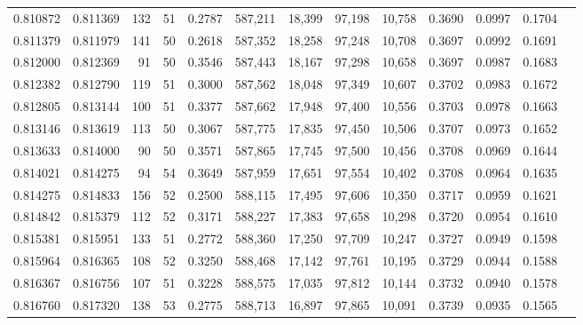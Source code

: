 \begin{tabular}{rrrrrrrrrrrrr}
0.810872 & 0.811369 &   132 &  51 &                                     0.2787 & 587,211 &  18,399 &  97,198 &  10,758 & 0.3690 & 0.0997 & 0.1704 \\
0.811379 & 0.811979 &   141 &  50 &                                     0.2618 & 587,352 &  18,258 &  97,248 &  10,708 & 0.3697 & 0.0992 & 0.1691 \\
0.812000 & 0.812369 &    91 &  50 &                                     0.3546 & 587,443 &  18,167 &  97,298 &  10,658 & 0.3697 & 0.0987 & 0.1683 \\
0.812382 & 0.812790 &   119 &  51 &                                     0.3000 & 587,562 &  18,048 &  97,349 &  10,607 & 0.3702 & 0.0983 & 0.1672 \\
0.812805 & 0.813144 &   100 &  51 &                                     0.3377 & 587,662 &  17,948 &  97,400 &  10,556 & 0.3703 & 0.0978 & 0.1663 \\
0.813146 & 0.813619 &   113 &  50 &                                     0.3067 & 587,775 &  17,835 &  97,450 &  10,506 & 0.3707 & 0.0973 & 0.1652 \\
0.813633 & 0.814000 &    90 &  50 &                                     0.3571 & 587,865 &  17,745 &  97,500 &  10,456 & 0.3708 & 0.0969 & 0.1644 \\
0.814021 & 0.814275 &    94 &  54 &                                     0.3649 & 587,959 &  17,651 &  97,554 &  10,402 & 0.3708 & 0.0964 & 0.1635 \\
0.814275 & 0.814833 &   156 &  52 &                                     0.2500 & 588,115 &  17,495 &  97,606 &  10,350 & 0.3717 & 0.0959 & 0.1621 \\
0.814842 & 0.815379 &   112 &  52 &                                     0.3171 & 588,227 &  17,383 &  97,658 &  10,298 & 0.3720 & 0.0954 & 0.1610 \\
0.815381 & 0.815951 &   133 &  51 &                                     0.2772 & 588,360 &  17,250 &  97,709 &  10,247 & 0.3727 & 0.0949 & 0.1598 \\
0.815964 & 0.816365 &   108 &  52 &                                     0.3250 & 588,468 &  17,142 &  97,761 &  10,195 & 0.3729 & 0.0944 & 0.1588 \\
0.816367 & 0.816756 &   107 &  51 &                                     0.3228 & 588,575 &  17,035 &  97,812 &  10,144 & 0.3732 & 0.0940 & 0.1578 \\
0.816760 & 0.817320 &   138 &  53 &                                     0.2775 & 588,713 &  16,897 &  97,865 &  10,091 & 0.3739 & 0.0935 & 0.1565 \\

\end{tabular}
